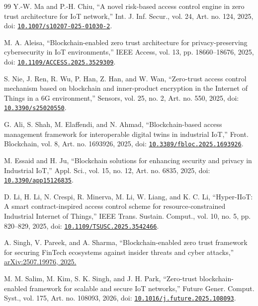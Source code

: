 \documentclass[a4paper,5p,times,twocolumn,number,sort&compress]{elsarticle}
\begin{document}
\begin{thebibliography}{99}
 Y.-W. Ma and P.-H. Chiu, ``A novel risk-based access control engine in zero trust architecture for IoT network,'' Int. J. Inf. Secur., vol. 24, Art. no. 124, 2025, doi: \href{https://doi.org/10.1007/s10207-025-01030-2}{\nolinkurl{10.1007/s10207-025-01030-2}}.

 M. A. Aleisa, ``Blockchain-enabled zero trust architecture for privacy-preserving cybersecurity in IoT environments,'' IEEE Access, vol. 13, pp. 18660--18676, 2025, doi: \href{https://doi.org/10.1109/ACCESS.2025.3529309}{\nolinkurl{10.1109/ACCESS.2025.3529309}}.

 S. Nie, J. Ren, R. Wu, P. Han, Z. Han, and W. Wan, ``Zero-trust access control mechanism based on blockchain and inner-product encryption in the Internet of Things in a 6G environment,'' Sensors, vol. 25, no. 2, Art. no. 550, 2025, doi: \href{https://doi.org/10.3390/s25020550}{\nolinkurl{10.3390/s25020550}}.

 G. Ali, S. Shah, M. Elaffendi, and N. Ahmad, ``Blockchain-based access management framework for interoperable digital twins in industrial IoT,'' Front. Blockchain, vol. 8, Art. no. 1693926, 2025, doi: \href{https://doi.org/10.3389/fbloc.2025.1693926}{\nolinkurl{10.3389/fbloc.2025.1693926}}.

 M. Essaid and H. Ju, ``Blockchain solutions for enhancing security and privacy in Industrial IoT,'' Appl. Sci., vol. 15, no. 12, Art. no. 6835, 2025, doi: \href{https://doi.org/10.3390/app15126835}{\nolinkurl{10.3390/app15126835}}.

 D. Li, H. Li, N. Crespi, R. Minerva, M. Li, W. Liang, and K. C. Li, ``Hyper-IIoT: A smart contract-inspired access control scheme for resource-constrained Industrial Internet of Things,'' IEEE Trans. Sustain. Comput., vol. 10, no. 5, pp. 820--829, 2025, doi: \href{https://doi.org/10.1109/TSUSC.2025.3542466}{\nolinkurl{10.1109/TSUSC.2025.3542466}}.

 A. Singh, V. Pareek, and A. Sharma, ``Blockchain-enabled zero trust framework for securing FinTech ecosystems against insider threats and cyber attacks,'' \href{https://arxiv.org/abs/2507.19976}{arXiv:2507.19976, 2025.}

 M. M. Salim, M. Kim, S. K. Singh, and J. H. Park, ``Zero-trust blockchain-enabled framework for scalable and secure IoT networks,'' Future Gener. Comput. Syst., vol. 175, Art. no. 108093, 2026, doi: \href{https://doi.org/10.1016/j.future.2025.108093}{\nolinkurl{10.1016/j.future.2025.108093}}.


\end{thebibliography}
\end{document}
